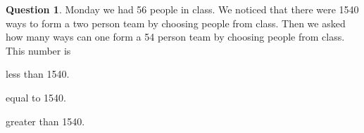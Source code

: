 \documentclass[12pt]{amsart}
\theoremstyle{definition}
\newtheorem{question}{Question}
\begin{document}
\begin{question}
Monday we had 56 people in class. %
We noticed that there were 1540 ways to form a two person team by choosing people from class.
Then we asked how many ways can one form a 54 person team by choosing people from class.
This number is
\begin{compactitem}
\item less than 1540.
\item equal to 1540.
\item greater than 1540.
\end{compactitem}
\end{question}
\end{document}
